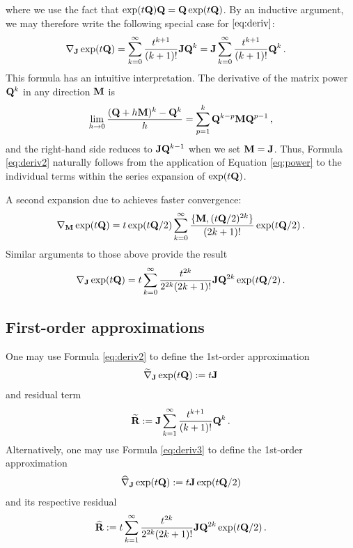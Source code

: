 \documentclass[12pt]{article} %
\begin{document}
where we use the fact that $\exp(t\mathbf{Q}) \mathbf{Q} = \mathbf{Q} \exp(t\mathbf{Q})$. By an inductive argument, we may therefore write the following special case for $\eqref{eq:deriv}$:
\begin{align}\label{eq:deriv2}
	\nabla_{\mathbf{J}} \exp(t \mathbf{Q})  &=  \sum_{k=0}^\infty \frac{t^{k+1}}{(k+1)!} \mathbf{J} \mathbf{Q}^k  = \mathbf{J}  \sum_{k=0}^\infty \frac{t^{k+1}}{(k+1)!}  \mathbf{Q}^k \, .
\end{align}
This formula has an intuitive interpretation.   The derivative of the matrix power $\mathbf{Q}^k$ in any direction $\mathbf{M}$ is
\begin{align}\label{eq:power}
	\lim_{h\rightarrow 0}  \frac{(\mathbf{Q}+h\mathbf{M})^k - \mathbf{Q}^k }{h} = \sum_{p=1}^k  \mathbf{Q}^{k-p} \mathbf{M} \mathbf{Q}^{p-1} \, ,
\end{align}
and the right-hand side reduces to $\mathbf{J}\mathbf{Q}^{k-1}$ when we set $\mathbf{M}=\mathbf{J}$.  Thus, Formula \eqref{eq:deriv2} naturally follows from the application of Equation \eqref{eq:power} to the individual terms within the series expansion of $\exp(t\mathbf{Q})$.

A second expansion due to \citet{najfeld1995derivatives} achieves faster convergence:
\begin{align}
	\nabla_{\mathbf{M}} \exp(t\mathbf{Q})  =  t\exp(t\mathbf{Q}/2)  \sum_{k=0}^\infty \frac{\{\mathbf{M},(t\mathbf{Q}/2)^{2k}\} }{(2k+1)!} \exp(t\mathbf{Q}/2) \, .
\end{align}
Similar arguments to those above provide the result
\begin{align}\label{eq:deriv3}
	\nabla_{\mathbf{J}} \exp(t\mathbf{Q})  =  t \sum_{k=0}^\infty  \frac{t^{2k}}{2^{2k}(2k+1)!} \mathbf{J}\mathbf{Q}^{2k}\exp(t\mathbf{Q}/2) \, .
\end{align}

\subsection{First-order approximations}

One may use Formula \eqref{eq:deriv2} to define the 1st-order approximation 
\begin{align*}
		\widetilde{\nabla}_{\mathbf{J}} \exp(t \mathbf{Q})  :=  t \mathbf{J}  
\end{align*}
and residual term
\begin{align*}
	\widetilde{\mathbf{R}} := \mathbf{J} \sum_{k=1}^\infty \frac{t^{k+1}}{(k+1)!}  \mathbf{Q}^k \, .
\end{align*}
Alternatively, one may use Formula  \eqref{eq:deriv3} to define the 1st-order approximation
\begin{align*}
		\widehat{\nabla}_{\mathbf{J}} \exp(t \mathbf{Q})  :=  t \mathbf{J}  \exp(t\mathbf{Q}/2)
\end{align*}
and its respective residual
\begin{align*}
	\widehat{\mathbf{R}} := t \sum_{k=1}^\infty  \frac{t^{2k}}{2^{2k}(2k+1)!} \mathbf{J}\mathbf{Q}^{2k}\exp(t\mathbf{Q}/2) \,.
\end{align*}
\end{document}
